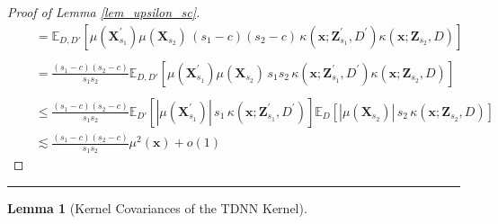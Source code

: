\documentclass[letterpaper,10pt]{article}
\numberwithin{equation}{section}
\numberwithin{thm}{section}
\newtheorem{lem}{Lemma}
\numberwithin{lem}{section}
\numberwithin{cor}{section}
\newcommand{\E}{\mathbb{E}}
\newcommand{\1}{\mathbbm{1}}
\begin{document}
\begin{proof}[Proof of Lemma \ref{lem_upsilon_sc}]
\begin{equation}
\begin{aligned}
			 & \quad = \E_{D, D'}\left[\mu(\mathbf{X}_{s_1}^{\prime}) \mu(\mathbf{X}_{s_2}) \, (s_1 - c)(s_2 -c) \,\kappa(\mathbf{x}; \mathbf{Z}_{s_1}^{\prime}, D^{\prime}) \kappa(\mathbf{x}; \mathbf{Z}_{s_2}, D)  \right]                        \\                                                                                                                                                                       \\
			 & \quad = \frac{(s_1 - c)(s_2 -c)}{s_1 s_2}\E_{D, D'}\left[\mu(\mathbf{X}_{s_1}^{\prime}) \mu(\mathbf{X}_{s_2}) \, s_1 s_2 \,\kappa(\mathbf{x}; \mathbf{Z}_{s_1}^{\prime}, D^{\prime}) \kappa(\mathbf{x}; \mathbf{Z}_{s_2}, D)  \right] \\                                                                                                                                                                       \\
			 & \quad \leq \frac{(s_1 - c)(s_2 -c)}{s_1 s_2}
			\E_{D'}\left[|\mu(\mathbf{X}_{s_1}^{\prime})| \, s_1 \,\kappa(\mathbf{x}; \mathbf{Z}_{s_1}^{\prime}, D^{\prime})   \right]
			\E_{D}\left[ |\mu(\mathbf{X}_{s_2})| \, s_2 \, \kappa(\mathbf{x}; \mathbf{Z}_{s_2}, D)  \right]                                                                                                                                          \\
			 & \quad \lesssim \frac{(s_1 - c)(s_2 -c)}{s_1 s_2}\mu^2(\mathbf{x}) + o(1)
		\end{aligned}
	\end{equation}
\end{proof}

\hrule

\begin{lem}[Kernel Covariances of the TDNN Kernel]\label{Cov_TDNN}

\end{lem}
\end{document}
